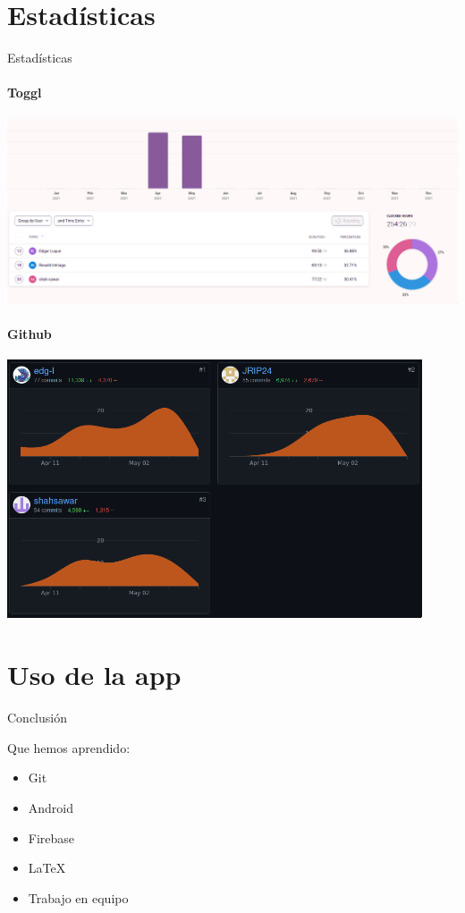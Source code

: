 \documentclass[12pt]{beamer}
\begin{document}
\section{Estadísticas}
\begin{frame}{Estadísticas}

 {
\framesubtitle{Toggl}
\includegraphics[width=\textwidth]{toggl-stats}
}

 {
\framesubtitle{Github}

\includegraphics[width=0.92\textwidth]{git-contributors}
}

\end{frame}


\section{Uso de la app}
\begin{frame}{Conclusión}

Que hemos aprendido:

\begin{itemize}
\item Git
\item Android
\item Firebase
\item \LaTeX
\item Trabajo en equipo
\end{itemize}


\end{frame}
\end{document}

